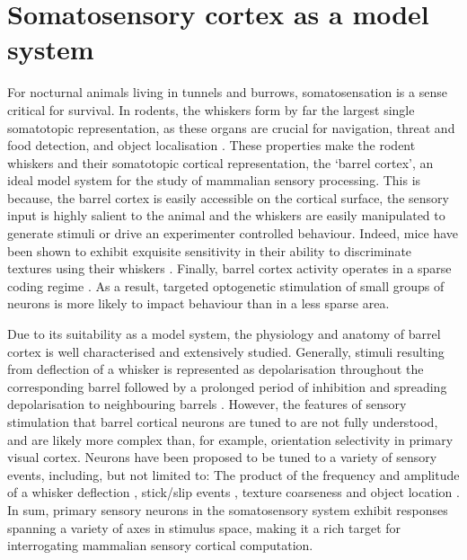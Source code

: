 \section{Somatosensory cortex as a model system}

For nocturnal animals living in tunnels and burrows, somatosensation is a sense critical for survival. In rodents, the whiskers form by far the largest single somatotopic representation, as these organs are crucial for navigation, threat and food detection, and object localisation \cite{gustafson_behavioral_1977}. These properties make the rodent whiskers and their somatotopic cortical representation, the ‘barrel cortex’, an ideal model system for the study of mammalian sensory processing. This is because, the barrel cortex is easily accessible on the cortical surface, the sensory input is highly salient to the animal and the whiskers are easily manipulated to generate stimuli or drive an experimenter controlled behaviour. Indeed, mice have been shown to exhibit exquisite sensitivity in their ability to discriminate textures using their whiskers \cite{wu_novel_2013}. Finally, barrel cortex activity operates in a sparse coding regime \cite{crochet_synaptic_2011}. As a result, targeted optogenetic stimulation of small groups of neurons is more likely to impact behaviour than in a less sparse area.

Due to its suitability as a model system, the physiology \cite{feldmeyer_barrel_2013} and anatomy \cite{petersen_functional_2007} of barrel cortex is well characterised and extensively studied. Generally, stimuli resulting from deflection of a whisker is represented as depolarisation throughout the corresponding barrel \cite{crochet_synaptic_2011} followed by a prolonged period of inhibition \cite{simons_response_1978} and spreading depolarisation to neighbouring barrels \cite{ferezou_visualizing_2006}. However, the features of sensory stimulation that barrel cortical neurons are tuned to are not fully understood, and are likely more complex than, for example, orientation selectivity in primary visual cortex. Neurons have been proposed to be tuned to a variety of sensory events, including, but not limited to: The product of the frequency and amplitude of a whisker deflection \cite{arabzadeh_encoding_2003}, stick/slip events \cite{jadhav_sparse_2009}, texture coarseness \cite{garion_texture_2014} and object location \cite{oconnor_neural_2010}. In sum, primary sensory neurons in the somatosensory system exhibit responses spanning a variety of axes in stimulus space, making it a rich target for interrogating mammalian sensory cortical computation. 

